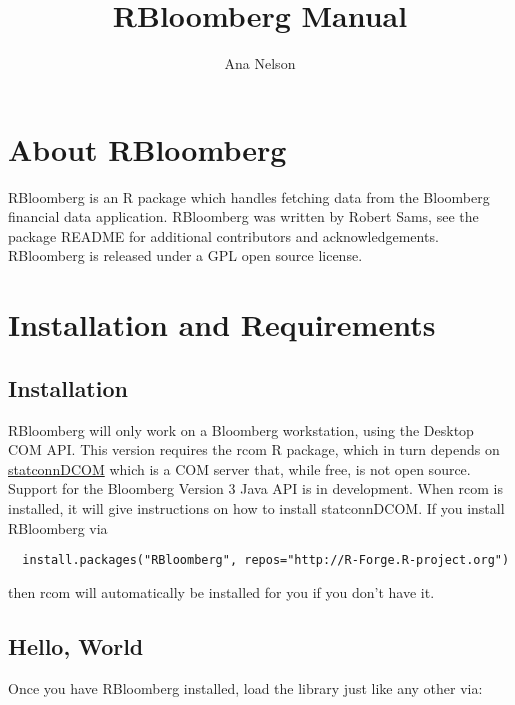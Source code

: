 \documentclass[a4paper]{article}
\title{RBloomberg Manual}
\author{Ana Nelson}
\begin{document}
\maketitle


\section{About RBloomberg} %
\label{sec:about}

RBloomberg is an R package which handles fetching data from the Bloomberg financial data application. RBloomberg was written by Robert Sams, see the package README for additional contributors and acknowledgements. RBloomberg is released under a GPL open source license.


\section{Installation and Requirements} %
\label{sec:installation_and_requirements}

\subsection{Installation} %
\label{sub:installation}

RBloomberg will only work on a Bloomberg workstation, using the Desktop COM API. This version requires the rcom R package, which in turn depends on \href{http://rcom.univie.ac.at/}{statconnDCOM} which is a COM server that, while free, is not open source. Support for the Bloomberg Version 3 Java API is in development. When rcom is installed, it will give instructions on how to install statconnDCOM. If you install RBloomberg via

\begin{verbatim}
  install.packages("RBloomberg", repos="http://R-Forge.R-project.org")
\end{verbatim}

then rcom will automatically be installed for you if you don't have it.


\subsection{Hello, World} %
\label{sub:hello_world}

Once you have RBloomberg installed, load the library just like any other via:
\end{document}
